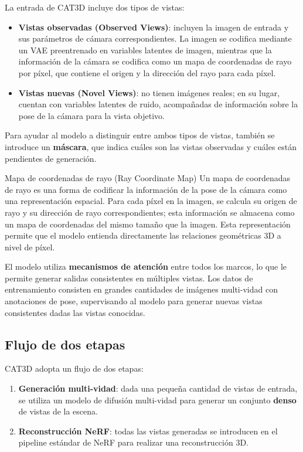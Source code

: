 \documentclass[a4paper]{article}
\begin{document}
La entrada de CAT3D incluye dos tipos de vistas:

\begin{itemize}
    \item \textbf{Vistas observadas (Observed Views)}: incluyen la imagen de entrada y sus parámetros de cámara correspondientes. La imagen se codifica mediante un VAE preentrenado en variables latentes de imagen, mientras que la información de la cámara se codifica como un mapa de coordenadas de rayo por píxel, que contiene el origen y la dirección del rayo para cada píxel.
    \item \textbf{Vistas nuevas (Novel Views)}: no tienen imágenes reales; en su lugar, cuentan con variables latentes de ruido, acompañadas de información sobre la pose de la cámara para la vista objetivo.
\end{itemize}

Para ayudar al modelo a distinguir entre ambos tipos de vistas, también se introduce un \textbf{máscara}, que indica cuáles son las vistas observadas y cuáles están pendientes de generación.

\begin{knowledgebox}{Mapa de coordenadas de rayo (Ray Coordinate Map)}
Un mapa de coordenadas de rayo es una forma de codificar la información de la pose de la cámara como una representación espacial. Para cada píxel en la imagen, se calcula su origen de rayo y su dirección de rayo correspondientes; esta información se almacena como un mapa de coordenadas del mismo tamaño que la imagen. Esta representación permite que el modelo entienda directamente las relaciones geométricas 3D a nivel de píxel.
\end{knowledgebox}

El modelo utiliza \textbf{mecanismos de atención} entre todos los marcos, lo que le permite generar salidas consistentes en múltiples vistas. Los datos de entrenamiento consisten en grandes cantidades de imágenes multi-vidad con anotaciones de pose, supervisando al modelo para generar nuevas vistas consistentes dadas las vistas conocidas.

\subsection{Flujo de dos etapas}

CAT3D adopta un flujo de dos etapas:

\begin{enumerate}
    \item \textbf{Generación multi-vidad}: dada una pequeña cantidad de vistas de entrada, se utiliza un modelo de difusión multi-vidad para generar un conjunto \textbf{denso} de vistas de la escena.
    \item \textbf{Reconstrucción NeRF}: todas las vistas generadas se introducen en el pipeline estándar de NeRF para realizar una reconstrucción 3D.
\end{enumerate}
\end{document}
